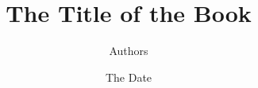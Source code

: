 \documentclass[a4paper,12pt,reqno]{book}
\begin{document}
\frontmatter
\title{The Title of the Book}
\author{Author{s}}
\date{The Date}
\maketitle
\tableofcontents



\ihead{}					%
\chead{\leftmark} %
\ohead{} 					%
\ifoot{}
\cfoot{\pagemark}
\ofoot{}



%
\end{document}
